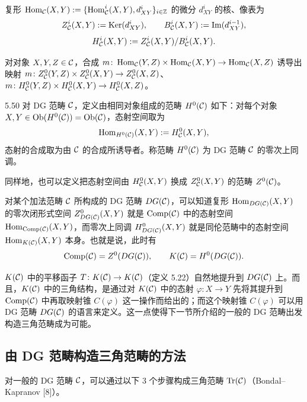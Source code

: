复形 $\operatorname{Hom}_{\mathcal{C}}(X,Y) := \{\operatorname{Hom}^{i}_{\mathcal{C}}(X,Y), d^{i}_{XY}\}_{i\in\mathbb{Z}}$ 的微分 $d^{i}_{XY}$ 的核、像表为
\begin{equation*}
  Z^{i}_{\mathcal{C}}(X,Y) := \operatorname{Ker}(d^{i}_{XY}), \qquad
  B^{i}_{\mathcal{C}}(X,Y) := \operatorname{Im}(d^{i-1}_{XY}),
\end{equation*}
\[
  H^{i}_{\mathcal{C}}(X,Y) := Z^{i}_{\mathcal{C}}(X,Y)/B^{i}_{\mathcal{C}}(X,Y).
\]

对对象 $X,Y,Z \in \mathcal{C}$，合成 $m \colon \operatorname{Hom}_{\mathcal{C}}(Y,Z) \times \operatorname{Hom}_{\mathcal{C}}(X,Y) \to \operatorname{Hom}_{\mathcal{C}}(X,Z)$ 诱导出映射 $m \colon Z^{0}_{\mathcal{C}}(Y,Z) \times Z^{0}_{\mathcal{C}}(X,Y) \to Z^{0}_{\mathcal{C}}(X,Z)$、$m \colon H^{0}_{\mathcal{C}}(Y,Z) \times H^{0}_{\mathcal{C}}(X,Y) \to H^{0}_{\mathcal{C}}(X,Z)$。

\begin{definition}{5.50} 对 DG 范畴 $\mathcal{C}$，定义由相同对象组成的范畴 $H^{0}(\mathcal{C})$ 如下：对每个对象 $X,Y \in \operatorname{Ob}(H^{0}(\mathcal{C})) = \operatorname{Ob}(\mathcal{C})$，态射空间取为
\[
  \operatorname{Hom}_{H^{0}(\mathcal{C})}(X,Y) := H^{0}_{\mathcal{C}}(X,Y),
\]
态射的合成取为由 $\mathcal{C}$ 的合成所诱导者。称范畴 $H^{0}(\mathcal{C})$ 为 DG 范畴 $\mathcal{C}$ 的零次上同调。\end{definition}

同样地，也可以定义把态射空间由 $H^{0}_{\mathcal{C}}(X,Y)$ 换成 $Z^{0}_{\mathcal{C}}(X,Y)$ 的范畴 $Z^{0}(\mathcal{C})$。

对某个加法范畴 $\mathcal{C}$ 所构成的 DG 范畴 $DG(\mathcal{C})$，可以知道复形 $\operatorname{Hom}_{DG(\mathcal{C})}(X,Y)$ 的零次闭形式空间 $Z^{0}_{DG(\mathcal{C})}(X,Y)$ 就是 $\operatorname{Comp}(\mathcal{C})$ 中的态射空间 $\operatorname{Hom}_{\operatorname{Comp}(\mathcal{C})}(X,Y)$，而零次上同调 $H^{0}_{DG(\mathcal{C})}(X,Y)$ 就是同伦范畴中的态射空间 $\operatorname{Hom}_{K(\mathcal{C})}(X,Y)$ 本身。也就是说，此时有
\[
  \operatorname{Comp}(\mathcal{C}) = Z^{0}(DG(\mathcal{C})), \qquad K(\mathcal{C}) = H^{0}(DG(\mathcal{C})).
\]

$K(\mathcal{C})$ 中的平移函子 $T \colon K(\mathcal{C}) \to K(\mathcal{C})$（定义 5.22）自然地提升到 $DG(\mathcal{C})$ 上。而且，$K(\mathcal{C})$ 中的三角结构，是通过对 $K(\mathcal{C})$ 中的态射 $\varphi \colon X \to Y$ 先将其提升到 $\operatorname{Comp}(\mathcal{C})$ 中再取映射锥 $C(\varphi)$ 这一操作而给出的；而这个映射锥 $C(\varphi)$ 可以用 DG 范畴 $DG(\mathcal{C})$ 的语言来定义。这一点使得下一节所介绍的一般的 DG 范畴出发构造三角范畴成为可能。

\subsection{由 DG 范畴构造三角范畴的方法}

对一般的 DG 范畴 $\mathcal{C}$，可以通过以下 3 个步骤构成三角范畴 $\operatorname{Tr}(\mathcal{C})$（Bondal–Kapranov [8]）。

